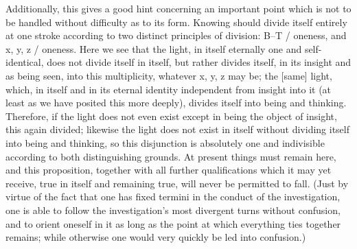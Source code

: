 Additionally, this gives a good hint
concerning an important point
which is not to be handled
without difficulty as to its form.
Knowing should divide itself entirely at one stroke
according to two distinct principles of division:
B–T / oneness, and x, y, z / oneness.
Here we see that the light,
in itself eternally one and self-identical,
does not divide itself in itself,
but rather divides itself,
in its insight and as being seen,
into this multiplicity, whatever x, y, z may be;
the [same] light, which, in itself and in its eternal
identity independent from insight into it
(at least as we have posited this more deeply),
divides itself into being and thinking.
Therefore, if the light does not even exist
except in being the object of insight,
this again divided;
likewise the light does not exist in itself
without dividing itself into being and thinking,
so this disjunction is absolutely one and indivisible
according to both distinguishing grounds.
At present things must remain here,
and this proposition, together with all
further qualifications which it may yet receive,
true in itself and remaining true,
will never be permitted to fall.
(Just by virtue of the fact that
one has fixed termini in
the conduct of the investigation,
one is able to follow the investigation's
most divergent turns without confusion,
and to orient oneself in it
as long as the point at which
everything ties together remains;
while otherwise one would very quickly
be led into confusion.)

